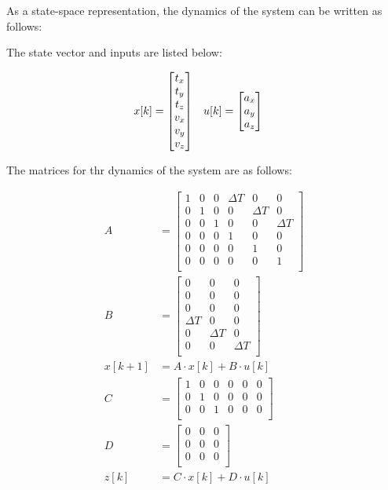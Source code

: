 \documentclass[bare_jrnl_transmag]{subfiles}
\begin{document}
As a state-space representation, the dynamics of the system can be written as follows:

The state vector and inputs are listed below:

\begin{align*}
    x[k] &= {\null\hbox{$\begin{bmatrix}
    t_x \\
    t_y \\
    t_z \\
    v_x \\
    v_y \\
    v_z
    \end{bmatrix}$}}
    \quad
    u[k] = {\null\hbox{$\begin{bmatrix}
    a_x \\
    a_y \\
    a_z
    \end{bmatrix}$}}
\end{align*}

The matrices for thr dynamics of the system are as follows:

\begin{align*}
    A &= 
    \begin{bmatrix}
    1 & 0 & 0 & \Delta T & 0 & 0 \\
    0 & 1 & 0 & 0 & \Delta T & 0 \\
    0 & 0 & 1 & 0 & 0 & \Delta T \\
    0 & 0 & 0 & 1 & 0 & 0 \\
    0 & 0 & 0 & 0 & 1 & 0 \\
    0 & 0 & 0 & 0 & 0 & 1 \\
    \end{bmatrix}
    \\[1em]
    B &= 
    \begin{bmatrix}
    0 & 0 & 0 \\
    0 & 0 & 0 \\
    0 & 0 & 0 \\
    \Delta T & 0 & 0 \\
    0 & \Delta T & 0 \\
    0 & 0 & \Delta T \\
    \end{bmatrix}
    \\[1em]
    x[k+1] &= A \cdot x[k] + B \cdot u[k]
    \\[1em]
    C &= 
    \begin{bmatrix}
    1 & 0 & 0 & 0 & 0 & 0 \\
    0 & 1 & 0 & 0 & 0 & 0 \\
    0 & 0 & 1 & 0 & 0 & 0 \\
    \end{bmatrix}
    \\[1em]
    D &= 
    \begin{bmatrix}
    0 & 0 & 0 \\
    0 & 0 & 0 \\
    0 & 0 & 0 \\
    \end{bmatrix}
    \\[1em]
    z[k] &= C \cdot x[k] + D \cdot u[k]
\end{align*}
\end{document}
